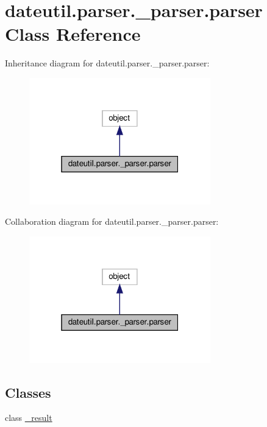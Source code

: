 \hypertarget{classdateutil_1_1parser_1_1__parser_1_1parser}{}\section{dateutil.\+parser.\+\_\+parser.\+parser Class Reference}
\label{classdateutil_1_1parser_1_1__parser_1_1parser}


Inheritance diagram for dateutil.\+parser.\+\_\+parser.\+parser\+:
\nopagebreak
\begin{figure}[H]
\begin{center}
\leavevmode
\includegraphics[width=223pt]{classdateutil_1_1parser_1_1__parser_1_1parser__inherit__graph}
\end{center}
\end{figure}


Collaboration diagram for dateutil.\+parser.\+\_\+parser.\+parser\+:
\nopagebreak
\begin{figure}[H]
\begin{center}
\leavevmode
\includegraphics[width=223pt]{classdateutil_1_1parser_1_1__parser_1_1parser__coll__graph}
\end{center}
\end{figure}
\subsection*{Classes}
\begin{DoxyCompactItemize}
\item 
class \hyperlink{classdateutil_1_1parser_1_1__parser_1_1parser_1_1__result}{\+\_\+result}
\end{DoxyCompactItemize}
